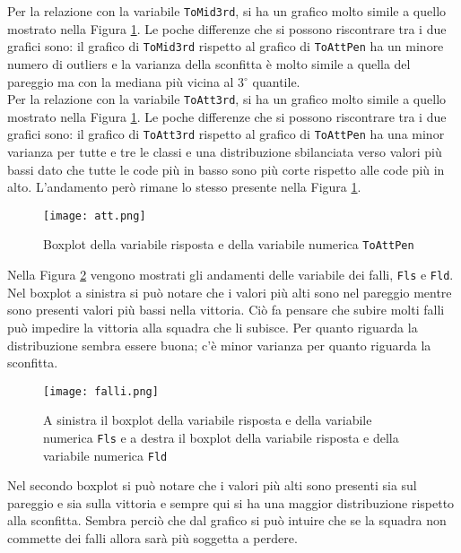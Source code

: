 Per la relazione con la variabile \texttt{ToMid3rd}, si ha un grafico molto simile a quello mostrato nella Figura \ref{fig:att}. Le poche differenze che si possono riscontrare tra i due grafici sono: il grafico di \texttt{ToMid3rd} rispetto al grafico di \texttt{ToAttPen} ha un minore numero di outliers e la varianza della sconfitta è molto simile a quella del pareggio ma con la mediana più vicina al 3$^{\circ}$ quantile.\\

Per la relazione con la variabile \texttt{ToAtt3rd}, si ha un grafico molto simile a quello mostrato nella Figura \ref{fig:att}. Le poche differenze che si possono riscontrare tra i due grafici sono: il grafico di \texttt{ToAtt3rd} rispetto al grafico di \texttt{ToAttPen} ha una minor varianza per tutte e tre le classi e una distribuzione sbilanciata verso valori più bassi dato che tutte le code più in basso sono più corte rispetto alle code più in alto. L'andamento però rimane lo stesso presente nella Figura \ref{fig:att}.\\

\begin{figure}[htbp]
	\begin{center}
		\texttt{[image: att.png]}
		\caption{Boxplot della variabile risposta e della variabile numerica \texttt{ToAttPen} } \label{fig:att}
	\end{center}
\end{figure}

Nella Figura \ref{fig:falli} vengono mostrati gli andamenti delle variabile dei falli, \texttt{Fls} e \texttt{Fld}. Nel boxplot a sinistra si può notare che i valori più alti sono nel pareggio mentre sono presenti valori più bassi nella vittoria. Ciò fa pensare che subire molti falli può impedire la vittoria alla squadra che li subisce. Per quanto riguarda la distribuzione sembra essere buona; c'è minor varianza per quanto riguarda la sconfitta. \\

\begin{figure}[htbp]
	\begin{center}
		\texttt{[image: falli.png]}
		\caption{A sinistra il boxplot della variabile risposta e della variabile numerica \texttt{Fls} e a destra il boxplot della variabile risposta e della variabile numerica \texttt{Fld} } \label{fig:falli}
	\end{center}
\end{figure}

Nel secondo boxplot si può notare che i valori più alti sono presenti sia sul pareggio e sia sulla vittoria e sempre qui si ha una maggior distribuzione rispetto alla sconfitta. Sembra perciò che dal grafico si può intuire che se la squadra non commette dei falli allora sarà più soggetta a perdere.\\

